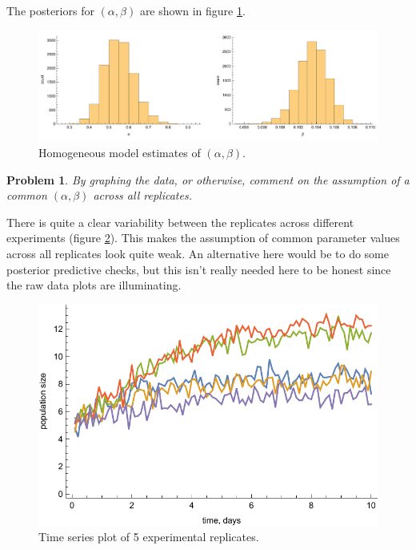 \documentclass{article}
\newtheorem{problem}{Problem}[section]
\begin{document}
The posteriors for $(\alpha,\beta)$ are shown in figure \ref{fig:homogeneous_estimates}.

\begin{figure}[ht]
	\centerline{\includegraphics[width=1\textwidth]{figures/prob6_alphaBeta.pdf}}
	\caption{Homogeneous model estimates of $(\alpha,\beta)$.}\label{fig:homogeneous_estimates}
\end{figure}

\begin{problem}
	By graphing the data, or otherwise, comment on the assumption of a common $(\alpha,\beta)$ across all replicates.
\end{problem}

There is quite a clear variability between the replicates across different experiments (figure \ref{fig:time_series}). This makes the assumption of common parameter values across all replicates look quite weak. An alternative here would be to do some posterior predictive checks, but this isn't really needed here to be honest since the raw data plots are illuminating.

\begin{figure}[ht]
	\centerline{\includegraphics[width=1\textwidth]{figures/prob6_timeSeries.pdf}}
	\caption{Time series plot of 5 experimental replicates.}\label{fig:time_series}
\end{figure}
\end{document}
